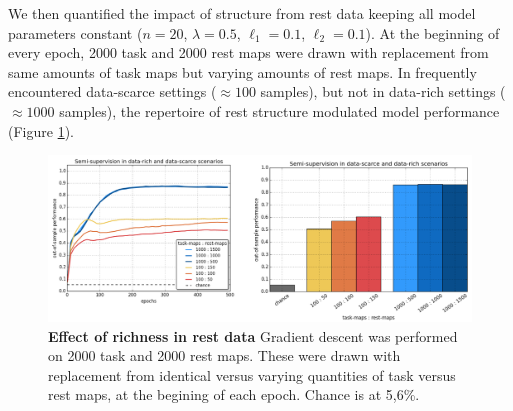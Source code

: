 \documentclass{article} %
\begin{document}
We then quantified the impact of structure from rest data keeping
all model parameters constant
($n=20$, $\lambda=0.5$, $\ell_1=0.1$, $\ell_2=0.1$).
At the beginning of every epoch,
2000 task and 2000 rest maps were drawn with replacement
from same amounts of task maps but varying amounts of rest maps.
In frequently encountered data-scarce settings ($\approx{100}$ samples),
but not in data-rich settings ($\approx{1000}$ samples),
the repertoire of rest structure modulated model performance
(Figure \ref{fig_semisup}).

\begin{figure}
\begin{centering}
\includegraphics[width=1.00\textwidth]{figures/semisup_both.png}
\end{centering}
\vspace{-0.5cm}
\caption{\textbf{Effect of richness in rest data}
Gradient descent was performed on 2000 task and 2000 rest maps.
These were drawn with replacement from identical versus varying
quantities of task versus rest maps, at the begining of each epoch.
Chance is at 5,6\%.
}
\label{fig_semisup}
\end{figure}
\end{document}
